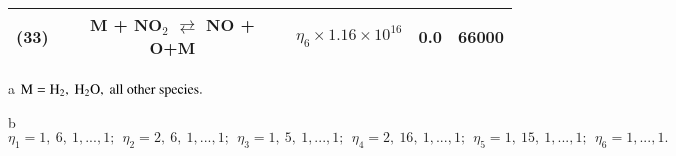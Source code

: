 \documentclass{warpdoc}
\begin{document}
\begin{table}[t]
\begin{center}
\begin{threeparttable}
\begin{tabular}{ccccc}
(33) & M + NO$_2$  $\rightleftarrows$ NO + O+M & $\eta_6 \times 1.16 \times 10^{16}$ & 0.0 & 66000 \\
\bottomrule
\end{tabular}
\begin{tablenotes}
\item[{a}] $\rm M=H_2,~H_2 O,~all~other~species.$
\item[{b}] $\eta_1=1,~6,~1,...,1;~~\eta_2=2,~6,~1,...,1;~~\eta_3=1,~5,~1,...,1;~~\eta_4=2,~16,~1,...,1;~~\eta_5=1,~15,~1,...,1;~~\eta_6=1,...,1.$
\end{tablenotes}
\label{tab:jachimowski}
\end{threeparttable}
\end{center}
\end{table}
%








~
\newpage
~
\newpage
~
\newpage
~
\newpage





\end{document}
